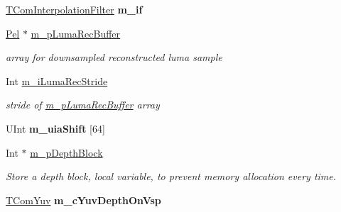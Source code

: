 \begin{DoxyCompactItemize}
\item 
\mbox{\label{class_t_com_prediction_a31fbf134f36b81e78e0d4fb313c7c240}} 
\hyperlink{class_t_com_interpolation_filter}{T\+Com\+Interpolation\+Filter} {\bfseries m\+\_\+if}
\item 
\mbox{\label{class_t_com_prediction_a2b228320a4833355b988c4faa0920d79}} 
\hyperlink{_type_def_8h_af92141699657699b4b547be0c8517541}{Pel} $\ast$ \hyperlink{class_t_com_prediction_a2b228320a4833355b988c4faa0920d79}{m\+\_\+p\+Luma\+Rec\+Buffer}
\begin{DoxyCompactList}\small\item\em array for downsampled reconstructed luma sample \end{DoxyCompactList}\item 
\mbox{\label{class_t_com_prediction_a114a5eb8eeef27c05cdc91fc8ccd3c73}} 
Int \hyperlink{class_t_com_prediction_a114a5eb8eeef27c05cdc91fc8ccd3c73}{m\+\_\+i\+Luma\+Rec\+Stride}
\begin{DoxyCompactList}\small\item\em stride of \hyperlink{class_t_com_prediction_a2b228320a4833355b988c4faa0920d79}{m\+\_\+p\+Luma\+Rec\+Buffer} array \end{DoxyCompactList}\item 
\mbox{\label{class_t_com_prediction_aada29d53577ba75623711e6a38bfd3bf}} 
U\+Int {\bfseries m\+\_\+uia\+Shift} \mbox{[}64\mbox{]}
\item 
\mbox{\label{class_t_com_prediction_aa23b255780f12bd0900b9b4c7b34dd53}} 
Int $\ast$ \hyperlink{class_t_com_prediction_aa23b255780f12bd0900b9b4c7b34dd53}{m\+\_\+p\+Depth\+Block}
\begin{DoxyCompactList}\small\item\em Store a depth block, local variable, to prevent memory allocation every time. \end{DoxyCompactList}\item 
\mbox{\label{class_t_com_prediction_a222f0967ddbc528092d83e57fcc46896}} 
\hyperlink{class_t_com_yuv}{T\+Com\+Yuv} {\bfseries m\+\_\+c\+Yuv\+Depth\+On\+Vsp}
\end{DoxyCompactItemize}
